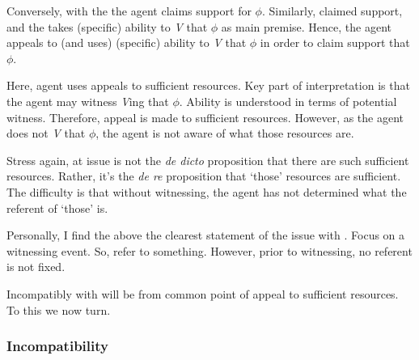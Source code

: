\begin{note}
  Conversely, with the \aben{} the agent claims support for \(\phi\).
  Similarly, claimed support, and the \aben{} takes (specific) ability to \emph{V} that \(\phi\) as main premise.
  Hence, the agent appeals to (and uses) (specific) ability to \emph{V} that \(\phi\) in order to claim support that \(\phi\).

  Here, agent uses appeals to sufficient resources.
  Key part of \WR{} interpretation is that the agent may witness \emph{V}ing that \(\phi\).
  Ability is understood in terms of potential witness.
  Therefore, appeal is made to sufficient resources.
  However, as the agent does not \emph{V} that \(\phi\), the agent is not aware of what those resources are.

  Stress again, at issue is not the \emph{de dicto} proposition that there are such sufficient resources.
  Rather, it's the \emph{de re} proposition that `those' resources are sufficient.
  The difficulty is that without witnessing, the agent has not determined what the referent of `those' is.

  Personally, I find the above the clearest statement of the issue with \WR{}.
  Focus on a witnessing event.
  So, refer to something.
  However, prior to witnessing, no referent is not fixed.
\end{note}

\begin{note}
  Incompatibly with \ESU{} will be from common point of appeal to sufficient resources.
  To this we now turn.
\end{note}

\subsubsection{Incompatibility}
\label{sec:incomp-wr-ura}

